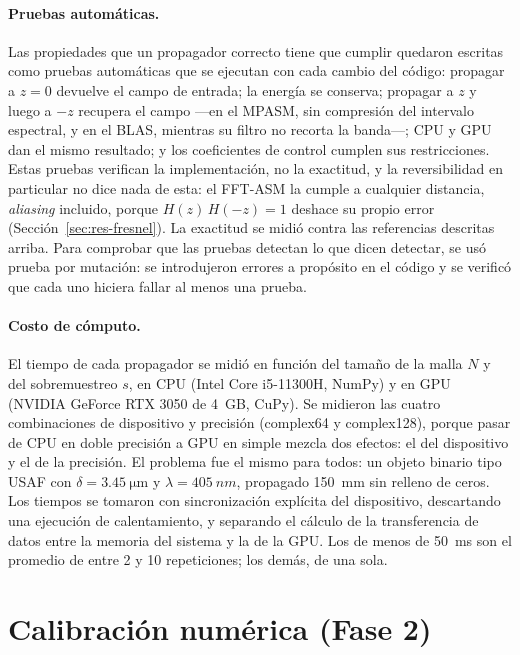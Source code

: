 \paragraph{Pruebas automáticas.} Las propiedades que un propagador correcto
tiene que cumplir quedaron escritas como pruebas automáticas que se ejecutan
con cada cambio del código: propagar a $z = 0$ devuelve el campo de entrada; la
energía se conserva; propagar a $z$ y luego a $-z$ recupera el campo ---en el
MPASM, sin compresión del intervalo espectral, y en el BLAS, mientras su
filtro no recorta la banda---; CPU y GPU dan el mismo resultado; y los
coeficientes de control cumplen sus restricciones. Estas pruebas verifican la
implementación, no la exactitud, y la reversibilidad en particular no dice
nada de esta: el FFT-ASM la cumple a cualquier distancia, \emph{aliasing}
incluido, porque $H(z)\,H(-z) = 1$ deshace su propio error
(Sección~\ref{sec:res-fresnel}). La exactitud se midió contra las referencias
descritas arriba. Para comprobar que las pruebas detectan lo que dicen detectar,
se usó prueba por mutación: se introdujeron errores a propósito en el código y
se verificó que cada uno hiciera fallar al menos una prueba.

\paragraph{Costo de cómputo.} El tiempo de cada propagador se midió en función
del tamaño de la malla $N$ y del sobremuestreo $s$, en CPU (Intel Core
i5-11300H, NumPy) y en GPU (NVIDIA GeForce RTX 3050 de \SI{4}{GB}, CuPy). Se
midieron las cuatro combinaciones de dispositivo y precisión (complex64 y
complex128), porque pasar de CPU en doble precisión a GPU en simple mezcla dos
efectos: el del dispositivo y el de la precisión. El problema fue el mismo
para todos: un objeto binario tipo USAF con $\delta = \SI{3.45}{\micro\metre}$
y $\lambda = \SI{405}{nm}$, propagado \SI{150}{mm} sin relleno de ceros. Los
tiempos se tomaron con sincronización explícita del dispositivo, descartando
una ejecución de calentamiento, y separando el cálculo de la transferencia de
datos entre la memoria del sistema y la de la GPU. Los de menos de
\SI{50}{ms} son el promedio de entre 2 y 10 repeticiones; los demás, de una
sola.

\section{Calibración numérica (Fase 2)}
\label{sec:calibracion}

